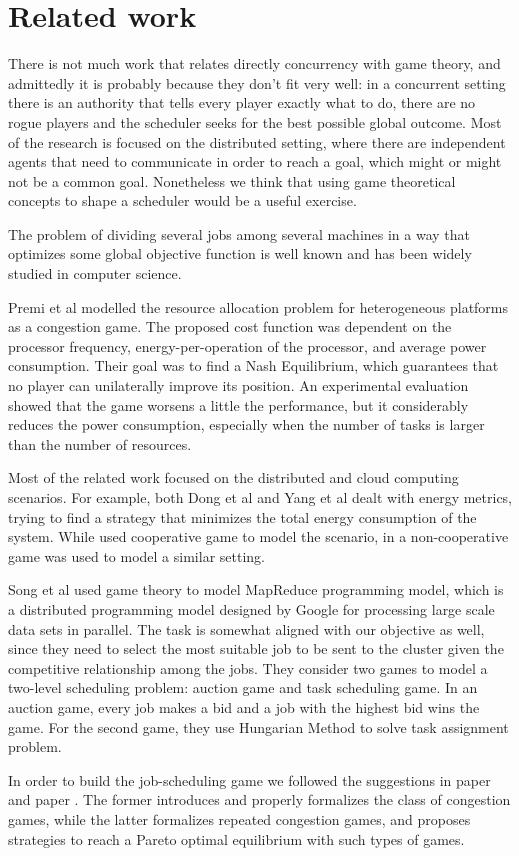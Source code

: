 \section{Related work}

There is not much work that relates directly concurrency with game theory,
and admittedly it is probably because they don't fit very well: in a concurrent
setting there is an authority that tells every player exactly what to do,
there are no rogue players and the scheduler seeks for the best possible global
outcome. Most of the research is focused on the distributed setting, where
there are independent agents that need to communicate in order to reach a 
goal, which might or might not be a common goal.
Nonetheless we think that using game theoretical concepts to shape a scheduler
would be a useful exercise.

The problem of dividing several jobs among several machines in a way 
that optimizes some global objective function is well known and has 
been widely studied in computer science. 

Premi et al \cite{9244046} modelled the resource allocation 
problem for heterogeneous platforms as a congestion game. 
The proposed cost function was dependent on the processor frequency, 
energy-per-operation of the processor, and average power consumption. 
Their goal was to find a Nash Equilibrium, which guarantees that no player 
can unilaterally improve its position. 
An experimental evaluation showed that the game worsens a little the performance, 
but it considerably reduces the power consumption, 
especially when the number of tasks is larger than the number of resources. 

Most of the related work focused on the distributed and cloud computing scenarios. 
For example, both Dong et al \cite{10.1145/2639108.2639128} 
and Yang et al \cite{7425237} dealt with energy metrics, 
trying to find a strategy that minimizes the total energy consumption of the system. 
While \cite{10.1145/2639108.2639128} used cooperative game to model the scenario, 
in \cite{7425237} a non-cooperative game was used to model a similar setting.

Song et al \cite{10.1007/978-1-4614-7010-6_33} used game theory to model MapReduce programming model, 
which is a distributed programming model designed by Google for processing large 
scale data sets in parallel. The task is somewhat aligned with our objective as well, 
since they need to select the most suitable job to be sent to the cluster given the 
competitive relationship among the jobs. They consider two games to model a two-level 
scheduling problem: auction game and task scheduling game. In an auction game, 
every job makes a bid and a job with the highest bid wins the game. 
For the second game, they use Hungarian Method to solve task assignment problem.

In order to build the job-scheduling game we followed the suggestions in paper \cite{rosenthal_class_1973}
and paper \cite{10.1145/1807406.1807411}. The former introduces and properly formalizes the class of congestion
games, while the latter formalizes repeated congestion games, and proposes strategies
to reach a Pareto optimal equilibrium with such types of games.
